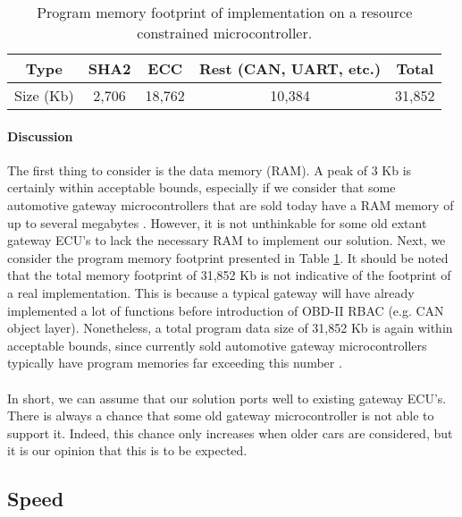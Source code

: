 \begin{table}[]
	\centering
	\begin{tabular}{|c|c|c|c||c|}
		\hline
		\rowcolor[HTML]{9B9B9B} Type & SHA2 & ECC & Rest (CAN, UART, etc.) & Total \\ \hline
		\cellcolor[HTML]{9B9B9B} Size (Kb) & \cellcolor[HTML]{FFFFFF} 2,706 & 18,762 & 10,384 & 31,852 \\ \hline
	\end{tabular}
	\caption{Program memory footprint of implementation on a resource constrained microcontroller.}
	\label{table:portability}
\end{table}

\paragraph{Discussion} The first thing to consider is the data memory (RAM). A peak of 3 Kb is certainly within acceptable bounds, especially if we consider that some automotive gateway microcontrollers that are sold today have a RAM memory of up to several megabytes \cite{GatewayInfineon,GatewayST}. However, it is not unthinkable for some old extant gateway ECU's to lack the necessary RAM to implement our solution. Next, we consider the program memory footprint presented in Table \ref{table:portability}. It should be noted that the total memory footprint of 31,852 Kb is not indicative of the footprint of a real implementation. This is because a typical gateway will have already implemented a lot of functions before introduction of OBD-II RBAC (e.g. CAN object layer). Nonetheless, a total program data size of 31,852 Kb is again within acceptable bounds, since currently sold automotive gateway microcontrollers typically have program memories far exceeding this number \cite{GatewayInfineon,GatewayAtmel,GatewayST}. \\ \\ In short, we can assume that our solution ports well to existing gateway ECU's. There is always a chance that some old gateway microcontroller is not able to support it. Indeed, this chance only increases when older cars are considered, but it is our opinion that this is to be expected.  


\subsection{Speed}
\label{sec:speed}

